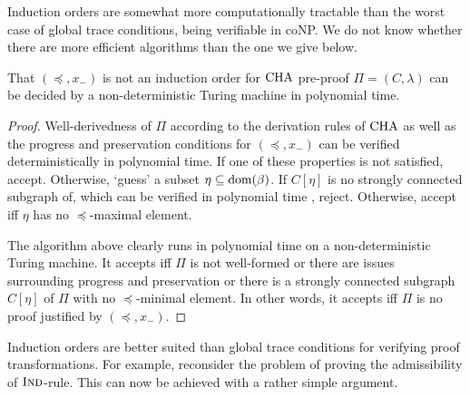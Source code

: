 Induction orders are somewhat more computationally tractable than the worst case
of global
trace conditions, being verifiable in coNP.
We do not know whether there are more efficient algorithms than the one we give
below.

\begin{proposition}
  That $(\preceq, x_{-})$ is not an induction order for $\mathrm{CHA}$ pre-proof $\Pi = (C,
  \lambda)$ can be decided by a non-deterministic Turing machine in polynomial
  time.
\end{proposition}
\begin{proof}
  Well-derivedness of $\Pi$ according to the derivation rules of $\mathrm{CHA}$ as well
  as the progress and preservation conditions for $(\preceq, x_{-})$ can be
  verified deterministically in polynomial time. If one of these properties is
  not satisfied, accept. Otherwise, `guess' a subset $\eta \subseteq
  \mathrm{dom}(\beta)$. If $C[\eta]$ is no strongly connected subgraph of, which can be
  verified in polynomial time \parencite{tarjanDepthFirstSearchLinear1972},
  reject. Otherwise, accept iff $\eta$ has no $\preceq$-maximal element.

  The algorithm above clearly runs in polynomial time on a non-deterministic
  Turing machine. It accepts iff $\Pi$ is not well-formed or there are issues
  surrounding progress and preservation or there is a strongly connected
  subgraph $C[\eta]$ of $\Pi$ with no $\preceq$-minimal element. In other
  words, it accepts iff $\Pi$ is no proof justified by $(\preceq, x_{-})$.
\end{proof}

Induction orders are better suited than global trace conditions for verifying
proof transformations. For example, reconsider the problem of proving the
admissibility of $\textsc{Ind}$-rule. This can now be achieved with a rather simple
argument.


